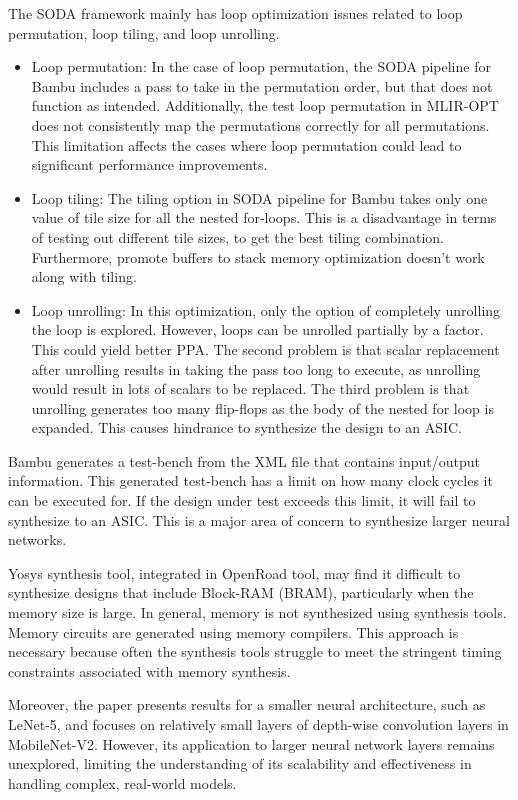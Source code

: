 The SODA framework mainly has loop optimization issues related to loop permutation, loop tiling, and loop unrolling. 
\begin{itemize}
    \item Loop permutation: In the case of loop permutation, the SODA pipeline for Bambu includes a pass to take in the permutation order, but that does not function as intended. Additionally, the test loop permutation in MLIR-OPT does not consistently map the permutations correctly for all permutations. This limitation affects the cases where loop permutation could lead to significant performance improvements.

    \item Loop tiling: The tiling option in SODA pipeline for Bambu takes only one value of tile size for all the nested for-loops. This is a disadvantage in terms of testing out different tile sizes, to get the best tiling combination. Furthermore, promote buffers to stack memory optimization doesn't work along with tiling.

    \item Loop unrolling: In this optimization, only the option of completely unrolling the loop is explored. However, loops can be unrolled partially by a factor. This could yield better PPA. The second problem is that scalar replacement after unrolling results in taking the pass too long to execute, as unrolling would result in lots of scalars to be replaced. The third problem is that unrolling generates too many flip-flops as the body of the nested for loop is expanded. This causes hindrance to synthesize the design to an ASIC.
\end{itemize}

Bambu generates a test-bench from the XML file that contains input/output information. This generated test-bench has a limit on how many clock cycles it can be executed for. If the design under test exceeds this limit, it will fail to synthesize to an ASIC. This is a major area of concern to synthesize larger neural networks.

Yosys synthesis tool, integrated in OpenRoad tool, may find it difficult to synthesize designs that include Block-RAM (BRAM), particularly when the memory size is large. In general, memory is not synthesized using synthesis tools. Memory circuits are generated using memory compilers. This approach is necessary because often the synthesis tools struggle to meet the stringent timing constraints associated with memory synthesis.

Moreover, the paper \cite{BohmAgostini2022BridgingPT} presents results for a smaller neural architecture, such as LeNet-5, and focuses on relatively small layers of depth-wise convolution layers in MobileNet-V2. However, its application to larger neural network layers remains unexplored, limiting the understanding of its scalability and effectiveness in handling complex, real-world models.

